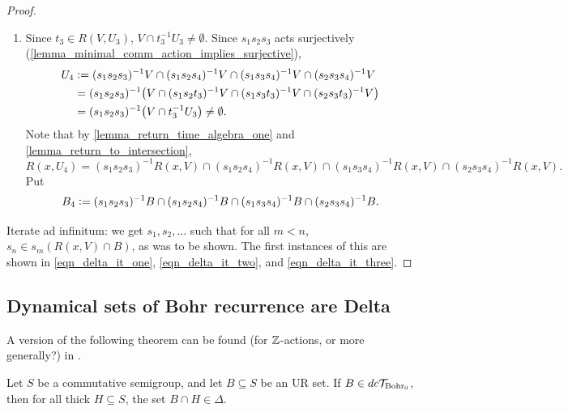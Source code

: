 \begin{proof}
\begin{enumerate}
\begin{enumerate}
            \item Since $t_3 \in R(V,U_3)$, $V \cap t_3^{-1} U_3 \neq \emptyset$.  Since $s_1s_2s_3$ acts surjectively (\cref{lemma_minimal_comm_action_implies_surjective}),
            \begin{align*}
                U_4 &\vcentcolon= (s_1s_2s_3)^{-1} V \cap (s_1 s_2 s_4)^{-1} V \cap (s_1 s_3 s_4)^{-1} V \cap (s_2s_3s_4)^{-1} V \\
                &= (s_1s_2s_3)^{-1} \big( V \cap (s_1 s_2t_3)^{-1} V \cap (s_1 s_3 t_3)^{-1} V \cap (s_2s_3 t_3)^{-1}V \big)\\
                &= (s_1s_2s_3)^{-1} \big( V \cap t_3^{-1} U_3\big) \neq \emptyset.
            \end{align*}
            Note that by \cref{lemma_return_time_algebra_one} and \cref{lemma_return_to_intersection},
            \[R(x,U_4) = (s_1s_2s_3)^{-1} R(x,V) \cap (s_1s_2s_4)^{-1} R(x,V) \cap (s_1s_3s_4)^{-1}R(x,V) \cap (s_2s_3s_4)^{-1}R(x,V).\]
            Put
            \[B_4 \vcentcolon= (s_1s_2s_3)^{-1} B \cap (s_1s_2s_4)^{-1} B \cap (s_1s_3s_4)^{-1} B \cap (s_2s_3s_4)^{-1} B.\]
        \end{enumerate}
    \end{enumerate}
    
    Iterate ad infinitum: we get $s_1, s_2, \dots$ such that for all $m < n$, $s_n \in s_m (R(x,V) \cap B)$, as was to be shown.  The first instances of this are shown in \eqref{eqn_delta_it_one}, \eqref{eqn_delta_it_two}, and \eqref{eqn_delta_it_three}.
\end{proof}

\subsection{Dynamical sets of Bohr recurrence are Delta}

A version of the following theorem can be found (for $\mathbb{Z}$-actions, or more generally?) in \cite{huang_shao_ye_2016}.

\begin{theorem}
\label{thm_dcthickbohr_is_delta_for_rxu}
\leanok{}
    Let $S$ be a commutative semigroup, and let $B \subseteq S$ be an UR set.  If $B \in dc\mathcal{T}_{\text{Bohr}_0}$, then for all thick $H \subseteq S$, the set $B \cap H \in \Delta$.
\end{theorem}

